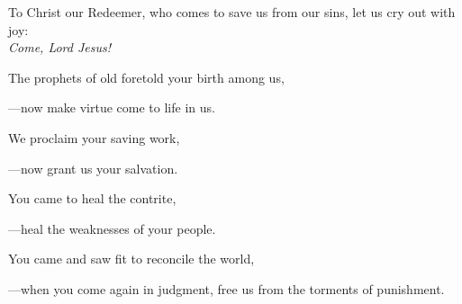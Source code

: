 \intercessions\indent

\begin{hangpar}

To Christ our Redeemer, who comes to save us from our sins, let us cry out with joy:\\
\emph{Come, Lord Jesus!}

\medskip The prophets of old foretold your birth among us,

{\color{red}---\thinspace}now make virtue come to life in us.

\medskip We proclaim your saving work,

{\color{red}---\thinspace}now grant us your salvation.

\medskip You came to heal the contrite,

{\color{red}---\thinspace}heal the weaknesses of your people.

\medskip You came and saw fit to reconcile the world,

{\color{red}---\thinspace}when you come again in judgment, free us from the torments of punishment.

\end{hangpar}